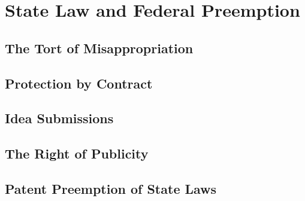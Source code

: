 \section{State Law and Federal Preemption}

\subsection{The Tort of Misappropriation}


\subsection{Protection by Contract}


\subsection{Idea Submissions}


\subsection{The Right of Publicity}


\subsection{Patent Preemption of State Laws}

